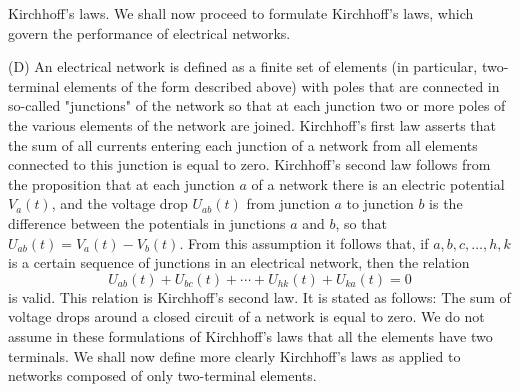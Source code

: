 \documentclass[10pt,a5paper]{book}
\theoremstyle{plain}
\theoremstyle{definition}
\theoremstyle{remark}
\begin{document}
Kirchhoff's laws. We shall now proceed to formulate Kirchhoff's laws, which govern the performance of electrical networks.

(D) An electrical network is defined as a finite set of elements (in particular, two-terminal elements of the form described above) with poles that are connected in so-called "junctions" of the network so that at each junction two or more poles of the various elements of the network are joined. Kirchhoff's first law asserts that the sum of all currents entering each junction of a network from all elements connected to this junction is equal to zero. Kirchhoff's second law follows from the proposition that at each junction $a$ of a network there is an electric potential $V_{a}(t)$, and the voltage drop $U_{a b}(t)$ from junction $a$ to junction $b$ is the difference between the potentials in junctions $a$ and $b$, so that $U_{a b}(t)=V_{a}(t)-V_{b}(t)$. From this assumption it follows that, if $a, b, c, \ldots, h, k$ is a certain sequence of junctions in an electrical network, then the relation
\[
U_{a b}(t)+U_{b c}(t)+\cdots+U_{h k}(t)+U_{k a}(t)=0
\]
is valid. This relation is Kirchhoff's second law. It is stated as follows: The sum of voltage drops around a closed circuit of a network is equal to zero. We do not assume in these formulations of Kirchhoff's laws that all the elements have two terminals. We shall now define more clearly Kirchhoff's laws as applied to networks composed of only two-terminal elements.
\end{document}
